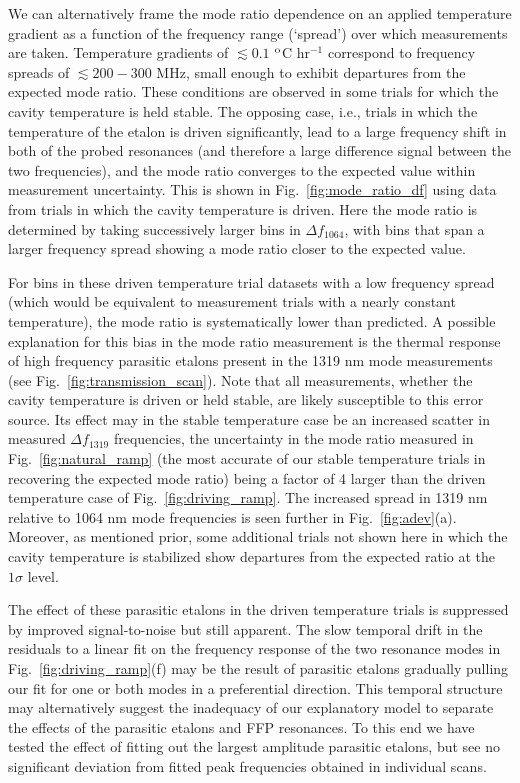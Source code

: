 \documentclass[10pt]{article}
\newcommand{\dC}{$^{\rm o}$C}
\begin{document}
We can alternatively frame the mode ratio dependence on an applied temperature gradient as a function of the frequency range (\lq{}spread\rq{}) over which measurements are taken. Temperature gradients of $\lesssim 0.1$ {\dC} hr$^{-1}$ correspond to frequency spreads of $\lesssim 200-300$ MHz, small enough to exhibit departures from the expected mode ratio. These conditions are observed in some trials for which the cavity temperature is held stable. The opposing case, i.e., trials in which the temperature of the etalon is driven significantly, lead to a large frequency shift in both of the probed resonances (and therefore a large difference signal between the two frequencies), and the mode ratio converges to the expected value within measurement uncertainty. This is shown in Fig.~\ref{fig:mode_ratio_df} using data from trials in which the cavity temperature is driven. Here the mode ratio is determined by taking successively larger bins in $\Delta f_{1064}$, with bins that span a larger frequency spread showing a mode ratio closer to the expected value.

For bins in these driven temperature trial datasets with a low frequency spread (which would be equivalent to measurement trials with a nearly constant temperature), the mode ratio is systematically lower than predicted. A possible explanation for this bias in the mode ratio measurement is the thermal response of high frequency parasitic etalons present in the 1319 nm mode measurements (see Fig.~\ref{fig:transmission_scan}). Note that all measurements, whether the cavity temperature is driven or held stable, are likely susceptible to this error source. Its effect may in the stable temperature case be an increased scatter in measured $\Delta f_{1319}$ frequencies, the uncertainty in the mode ratio measured in Fig.~\ref{fig:natural_ramp} (the most accurate of our stable temperature trials in recovering the expected mode ratio) being a factor of 4 larger than the driven temperature case of Fig.~\ref{fig:driving_ramp}. The increased spread in 1319 nm relative to 1064 nm mode frequencies is seen further in Fig.~\ref{fig:adev}(a). Moreover, as mentioned prior, some additional trials not shown here in which the cavity temperature is stabilized show departures from the expected ratio at the $1\sigma$ level. 

The effect of these parasitic etalons in the driven temperature trials is suppressed by improved signal-to-noise but still apparent. The slow temporal drift in the residuals to a linear fit on the frequency response of the two resonance modes in Fig.~\ref{fig:driving_ramp}(f) may be the result of parasitic etalons gradually pulling our fit for one or both modes in a preferential direction. This temporal structure may alternatively suggest the inadequacy of our explanatory model to separate the effects of the parasitic etalons and FFP resonances. To this end we have tested the effect of fitting out the largest amplitude parasitic etalons, but see no significant deviation from fitted peak frequencies obtained in individual scans.
\end{document}
